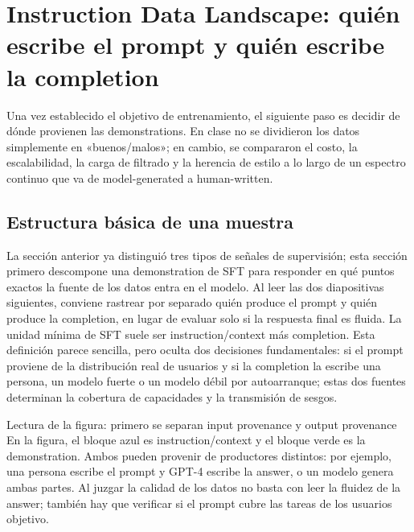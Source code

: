 \section{Instruction Data Landscape: quién escribe el prompt y quién escribe la completion}

Una vez establecido el objetivo de entrenamiento, el siguiente paso es decidir de dónde provienen las demonstrations. En clase no se dividieron los datos simplemente en «buenos/malos»; en cambio, se compararon el costo, la escalabilidad, la carga de filtrado y la herencia de estilo a lo largo de un espectro continuo que va de model-generated a human-written.

\subsection{Estructura básica de una muestra}

La sección anterior ya distinguió tres tipos de señales de supervisión; esta sección primero descompone una demonstration de SFT para responder en qué puntos exactos la fuente de los datos entra en el modelo. Al leer las dos diapositivas siguientes, conviene rastrear por separado quién produce el prompt y quién produce la completion, en lugar de evaluar solo si la respuesta final es fluida. La unidad mínima de SFT suele ser instruction/context más completion. Esta definición parece sencilla, pero oculta dos decisiones fundamentales: si el prompt proviene de la distribución real de usuarios y si la completion la escribe una persona, un modelo fuerte o un modelo débil por autoarranque; estas dos fuentes determinan la cobertura de capacidades y la transmisión de sesgos.


\begin{knowledgebox}{Lectura de la figura: primero se separan input provenance y output provenance}
En la figura, el bloque azul es instruction/context y el bloque verde es la demonstration. Ambos pueden provenir de productores distintos: por ejemplo, una persona escribe el prompt y GPT-4 escribe la answer, o un modelo genera ambas partes. Al juzgar la calidad de los datos no basta con leer la fluidez de la answer; también hay que verificar si el prompt cubre las tareas de los usuarios objetivo.
\end{knowledgebox}


